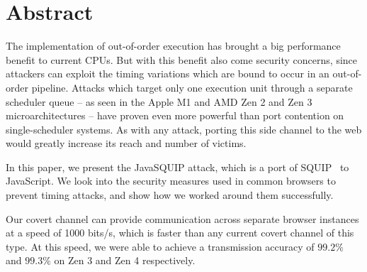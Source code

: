 \documentclass[11pt,
  titlepage=false,
]{scrreprt}
\begin{document}







\printthesistitle

\chapter*{\centering\Large Abstract}
\label{ch:abstract}
The implementation of out-of-order execution has brought a big performance benefit to current CPUs.
But with this benefit also come security concerns, since attackers can exploit the timing variations which are bound to occur in an out-of-order pipeline.
Attacks which target only one execution unit through a separate scheduler queue -- as seen in the Apple M1 and AMD Zen 2 and Zen 3 microarchitectures -- have proven even more powerful than port contention on single-scheduler systems.
As with any attack, porting this side channel to the web would greatly increase its reach and number of victims.

In this paper, we present the JavaSQUIP attack, which is a port of SQUIP~\cite{squip} to JavaScript.
We look into the security measures used in common browsers to prevent timing attacks, and show how we worked around them successfully.

Our covert channel can provide communication across separate browser instances at a speed of 1000 bits/s,
which is faster than any current covert channel of this type.
At this speed, we were able to achieve a transmission accuracy of $99.2\%$ and $99.3\%$ on Zen 3 and Zen 4 respectively.
\end{document}
